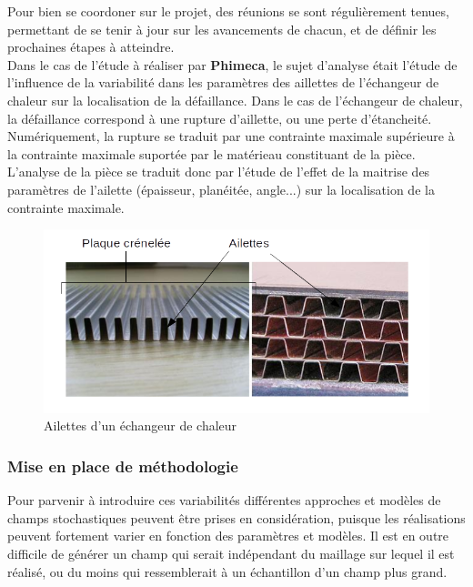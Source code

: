 \documentclass[a4paper,10pt]{article}
\begin{document}
Pour bien se coordoner sur le projet, des réunions se sont régulièrement tenues, permettant de se tenir à jour sur les avancements de chacun, et de définir les prochaines étapes à atteindre. \\ 

Dans le cas de l'étude à réaliser par \textbf{Phimeca}, le sujet d'analyse était l'étude de l'influence de la variabilité dans les paramètres des aillettes de l'échangeur de chaleur sur la localisation de la défaillance. Dans le cas de l'échangeur de chaleur, la défaillance correspond à une rupture d'aillette, ou une perte d'étancheité. \\

Numériquement, la rupture se traduit par une contrainte maximale supérieure à la contrainte maximale suportée par le matérieau constituant de la pièce. L'analyse de la pièce se traduit donc par l'étude de l'effet de la maitrise des paramètres de l'ailette (épaisseur, planéitée, angle...) sur la localisation de la contrainte maximale. 

\begin{figure}[H]
   \centering   
   \includegraphics[scale=0.45]{SchemaAilettes.png}
      \caption{Ailettes d'un échangeur de chaleur}
         \label{SchemaAilettes}
\end{figure}

\subsubsection{Mise en place de méthodologie }

Pour parvenir à introduire ces variabilités différentes approches et modèles de champs stochastiques peuvent être prises en considération, puisque les réalisations peuvent fortement varier en fonction des paramètres et modèles. Il est en outre difficile de générer un champ qui serait indépendant du maillage sur lequel il est réalisé, ou du moins qui ressemblerait à un échantillon d'un champ plus grand. 
\end{document}

